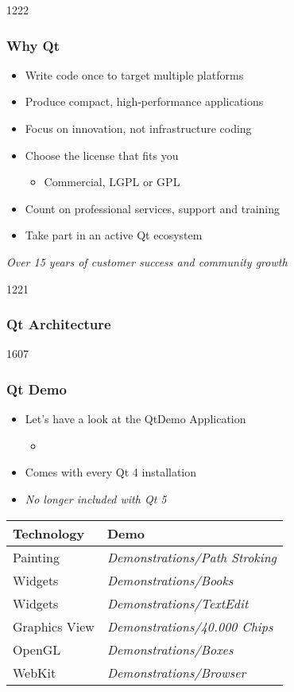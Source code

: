 \begin{slide}{1222}
  \frametitle{Why Qt}
  \begin{itemize}
  \item Write code once to target multiple platforms
  \item Produce compact, high-performance applications
  \item Focus on innovation, not infrastructure coding
  \item Choose the license that fits you
    \begin{itemize}
    \item Commercial, LGPL or GPL
    \end{itemize}
  \item Count on professional services, support and training
  \item Take part in an active Qt ecosystem
  \end{itemize}
  \vspace{1cm}
  \begin{block}{} {
      \textit{Over 15 years of customer success and community growth}
    }
  \end{block}
\end{slide}

\begin{slide}{1221}
  \frametitle{Qt Architecture}
\end{slide}

\begin{slide}{1607}
  \frametitle{Qt Demo}
  \begin{itemize}
  \item Let's have a look at the QtDemo Application
   \begin{itemize}
    \item {}
    \end{itemize}
  \item Comes with every Qt 4 installation
  \item \textit{No longer included with Qt 5}
 \end{itemize}
\medskip
\begin{tabular}{l|l}
    \textbf{Technology} & \textbf{Demo} \\ \hline
    Painting & \textit{Demonstrations/Path Stroking} \\\hline
    Widgets & \textit{Demonstrations/Books} \\\hline
    Widgets & \textit{Demonstrations/TextEdit} \\\hline
    Graphics View &\textit{Demonstrations/40.000 Chips} \\\hline
    OpenGL & \textit{Demonstrations/Boxes} \\\hline
    WebKit & \textit{Demonstrations/Browser} \\\hline
  \end{tabular}
\end{slide}
